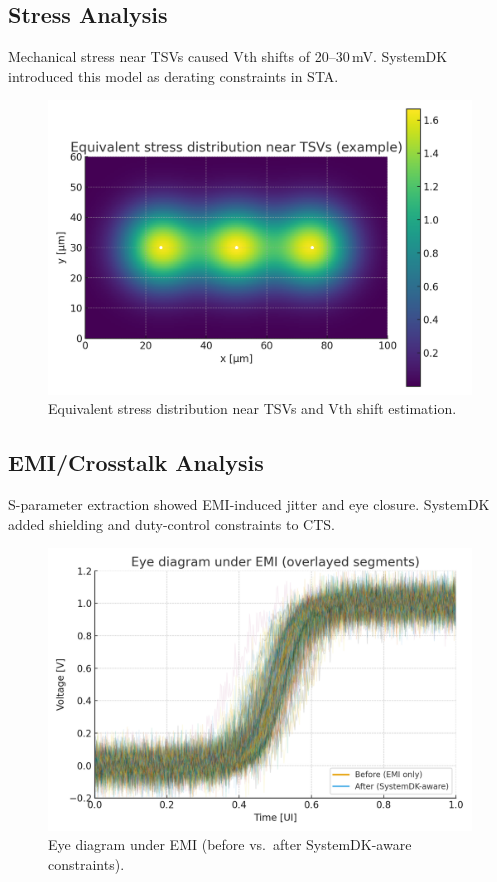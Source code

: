 \documentclass[conference]{IEEEtran}
\begin{document}
\subsection{Stress Analysis}
Mechanical stress near TSVs caused Vth shifts of 20--30\,mV.
SystemDK introduced this model as derating constraints in STA.

\begin{figure}[htbp]
  \centering
  \includegraphics[width=0.8\linewidth]{stress_map}
  \caption{Equivalent stress distribution near TSVs and Vth shift estimation.}
  \label{fig:stress}
\end{figure}

\subsection{EMI/Crosstalk Analysis}
S-parameter extraction showed EMI-induced jitter and eye closure.
SystemDK added shielding and duty-control constraints to CTS.

\begin{figure}[htbp]
  \centering
  \includegraphics[width=0.8\linewidth]{eye_diagram}
  \caption{Eye diagram under EMI (before vs.\ after SystemDK-aware constraints).}
  \label{fig:eye}
\end{figure}
\end{document}

